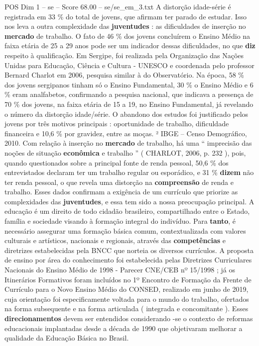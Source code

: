 \begin{textsample}{POS Dim 1 – se – Score 68.00 – se/se\_em\_3.txt}
A distorção idade-série é registrada em 33 \% do total de jovens, que afirmam ter parado de estudar.
Isso nos leva a outra complexidade das \textbf{juventudes} : as dificuldades de inserção no \textbf{mercado} de trabalho.
O fato de 46 \% dos jovens concluírem o Ensino Médio na faixa etária de 25 a 29 anos pode ser um indicador dessas dificuldades, no que \textbf{diz} respeito à qualificação.
Em Sergipe, foi realizada pela Organização das Nações Unidas para Educação, Ciência e Cultura - UNESCO e coordenada pelo professor Bernard Charlot em 2006, pesquisa similar à do Observatório.
Na época, 58 \% dos jovens sergipanos tinham só o Ensino Fundamental, 30 \% o Ensino Médio e 6 \% eram analfabetos, confirmando a pesquisa nacional, que indicava a presença de 70 \% dos jovens, na faixa etária de 15 a 19, no Ensino Fundamental, já revelando o número da distorção idade/série.
O abandono dos estudos foi justificado pelos jovens por três motivos principais : oportunidade de trabalho, dificuldade financeira e 10,6 \% por gravidez, entre as moças. ² IBGE – Censo Demográfico, 2010.
Com relação à inserção no \textbf{mercado} de trabalho, há uma “ imprecisão das noções de situação \textbf{econômica} e trabalho ” ( CHARLOT, 2006, p. 232 ), pois, quando questionados sobre a principal fonte de renda pessoal, 50,6 \% dos entrevistados declaram ter um trabalho regular ou esporádico, e 31 \% \textbf{dizem} não ter renda pessoal, o que revela uma distorção na \textbf{compreensão} de renda e trabalho.
Esses dados confirmam a exigência de um currículo que priorize as complexidades das \textbf{juventudes}, e essa tem sido a nossa preocupação principal.
A educação é um direito de todo cidadão brasileiro, compartilhado entre o Estado, família e sociedade visando à formação integral do indivíduo.
Para \textbf{tanto}, é necessário assegurar uma formação básica comum, contextualizada com valores culturais e artísticos, nacionais e regionais, através das \textbf{competências} e diretrizes estabelecidas pela BNCC que norteia os diversos currículos.
A proposta de ensino por área do conhecimento foi estabelecida pelas Diretrizes Curriculares Nacionais do Ensino Médio de 1998 - Parecer CNE/CEB nº 15/1998 ; já os Itinerários Formativos foram incluídos no 1º Encontro de Formação da Frente de Currículo para o Novo Ensino Médio do CONSED, realizado em junho de 2019, cuja orientação foi especificamente voltada para o mundo do trabalho, ofertados na forma subsequente e na forma articulada ( integrada e concomitante ).
Esses \textbf{direcionamentos} devem ser entendidos considerando -se o contexto de reformas educacionais implantadas desde a década de 1990 que objetivaram melhorar a qualidade da Educação Básica no Brasil.

\end{textsample}

